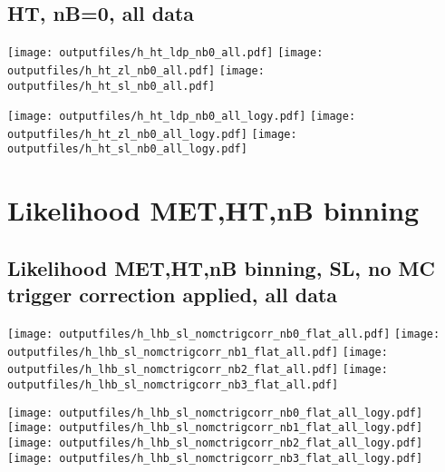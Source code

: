 \documentclass[11pt]{article}
\begin{document}
    \subsection{ HT, nB=0, all data}

    \noindent
    \texttt{[image: outputfiles/h\_ht\_ldp\_nb0\_all.pdf]}
    \texttt{[image: outputfiles/h\_ht\_zl\_nb0\_all.pdf]}
    \texttt{[image: outputfiles/h\_ht\_sl\_nb0\_all.pdf]}

    \noindent
    \texttt{[image: outputfiles/h\_ht\_ldp\_nb0\_all\_logy.pdf]}
    \texttt{[image: outputfiles/h\_ht\_zl\_nb0\_all\_logy.pdf]}
    \texttt{[image: outputfiles/h\_ht\_sl\_nb0\_all\_logy.pdf]}










   \section{Likelihood MET,HT,nB binning}
    \subsection{ Likelihood MET,HT,nB binning, SL, no MC trigger correction applied, all data}

    \noindent
     \texttt{[image: outputfiles/h\_lhb\_sl\_nomctrigcorr\_nb0\_flat\_all.pdf]}
     \texttt{[image: outputfiles/h\_lhb\_sl\_nomctrigcorr\_nb1\_flat\_all.pdf]}
     \texttt{[image: outputfiles/h\_lhb\_sl\_nomctrigcorr\_nb2\_flat\_all.pdf]}
     \texttt{[image: outputfiles/h\_lhb\_sl\_nomctrigcorr\_nb3\_flat\_all.pdf]}

    \noindent
     \texttt{[image: outputfiles/h\_lhb\_sl\_nomctrigcorr\_nb0\_flat\_all\_logy.pdf]}
     \texttt{[image: outputfiles/h\_lhb\_sl\_nomctrigcorr\_nb1\_flat\_all\_logy.pdf]}
     \texttt{[image: outputfiles/h\_lhb\_sl\_nomctrigcorr\_nb2\_flat\_all\_logy.pdf]}
     \texttt{[image: outputfiles/h\_lhb\_sl\_nomctrigcorr\_nb3\_flat\_all\_logy.pdf]}

    \clearpage
\end{document}

